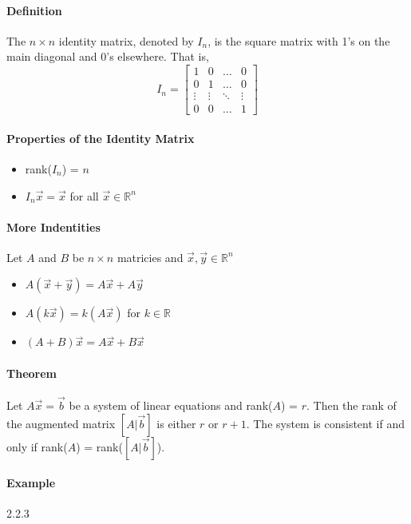 \paragraph*{Definition}
The $n \times n$ identity matrix, denoted by $I_n$, is the square matrix with 1's on the main diagonal and 0's elsewhere. That is,
\[I_n = \begin{bmatrix}
    1 & 0 & \ldots & 0 \\
    0 & 1 & \ldots & 0 \\
    \vdots & \vdots & \ddots & \vdots \\
    0 & 0 & \ldots & 1
\end{bmatrix}\]

\paragraph*{Properties of the Identity Matrix}
\begin{itemize}
    \item rank($I_n$) = $n$
    \item $I_n\vec{x} = \vec{x}$ for all $\vec{x} \in \mathbb{R}^n$
\end{itemize}

\paragraph*{More Indentities}
Let $A$ and $B$ be $n \times n$ matricies and $\vec{x}, \vec{y} \in \mathbb{R}^n$
\begin{itemize}
    \item $A(\vec{x} + \vec{y}) = A\vec{x} + A\vec{y}$
    \item $A(k\vec{x}) = k(A\vec{x})$ for $k \in \mathbb{R}$
    \item $(A + B)\vec{x} = A\vec{x} + B\vec{x}$
\end{itemize}

\paragraph*{Theorem}
Let $A\vec{x} = \vec{b}$ be a system of linear equations and rank($A$) = $r$. Then the 
rank of the augmented matrix $[A | \vec{b}]$ is either $r$ or $r + 1$. 
The system is consistent if and only if rank($A$) = rank($[A | \vec{b}]$).

\paragraph*{Example} 2.2.3

